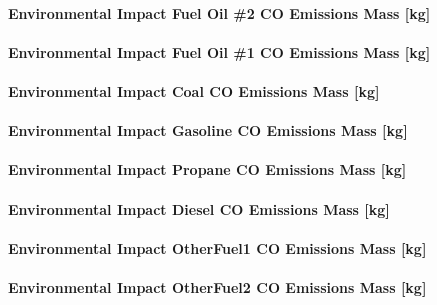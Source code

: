\paragraph{Environmental Impact Fuel Oil \#2 CO Emissions Mass {[}kg{]}}\label{environmental-impact-fuel-oil-2-co-emissions-mass-kg}

\paragraph{Environmental Impact Fuel Oil \#1 CO Emissions Mass {[}kg{]}}\label{environmental-impact-fuel-oil-1-co-emissions-mass-kg}

\paragraph{Environmental Impact Coal CO Emissions Mass {[}kg{]}}\label{environmental-impact-coal-co-emissions-mass-kg}

\paragraph{Environmental Impact Gasoline CO Emissions Mass {[}kg{]}}\label{environmental-impact-gasoline-co-emissions-mass-kg}

\paragraph{Environmental Impact Propane CO Emissions Mass {[}kg{]}}\label{environmental-impact-propane-co-emissions-mass-kg}

\paragraph{Environmental Impact Diesel CO Emissions Mass {[}kg{]}}\label{environmental-impact-diesel-co-emissions-mass-kg}

\paragraph{Environmental Impact OtherFuel1 CO Emissions Mass {[}kg{]}}\label{environmental-impact-otherfuel1-co-emissions-mass-kg}

\paragraph{Environmental Impact OtherFuel2 CO Emissions Mass {[}kg{]}}\label{environmental-impact-otherfuel2-co-emissions-mass-kg}

